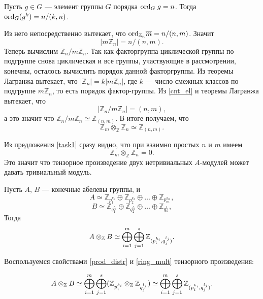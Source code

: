 \begin{Proof}
        \begin{Statement}
            \cite{Vinberg} Пусть $g \in G$ --- элемент группы $G$ порядка $\textup{ord}_G\;g = n$. Тогда $\textup{ord}_G(g^k) = n/(k, n)$.
        \end{Statement}
        Из него непосредственно вытекает, что $\textup{ord}_{\mathbb{Z}_n} \overline{m} = n / (n, m)$. Значит 
        \begin{equation} \label{cnt_el}
            |m\mathbb{Z}_n| = n / (n, m). 
        \end{equation}
        Теперь вычислим $\mathbb{Z}_n / m\mathbb{Z}_n$. Так как факторгруппа циклической группы по подгруппе снова циклическая и все группы, участвующие
        в рассмотрении, конечны, осталось вычислить порядок данной факторгруппы. Из теоремы Лагранжа вытекает, что $|\mathbb{Z}_n| = k|m\mathbb{Z}_n|$, где $k$ --- число смежных классов по
        подгруппе $m\mathbb{Z}_n$, то есть порядок фактор-группы. Из \eqref{cnt_el} и теоремы Лагранжа вытекает, что 
        \begin{equation*}
            |\mathbb{Z}_n / m\mathbb{Z}_n| = (n, m),
        \end{equation*}
        а это значит что $\mathbb{Z}_n / m\mathbb{Z}_n \simeq \mathbb{Z}_{(n, m)}$. В итоге получаем, что
        \begin{equation*}
            \mathbb{Z}_m \otimes_\mathbb{Z} \mathbb{Z}_n \simeq \mathbb{Z}_{(n, m)}.
        \end{equation*}
    \end{Proof}

    Из предложения \ref{task1} сразу видно, что при взаимно простых $n$ и $m$ имеем $$\mathbb{Z}_m \otimes_\mathbb{Z} \mathbb{Z}_n = 0.$$ Это значит что тензорное произведение
    двух нетривиальных $A$-модулей может давать тривиальный модуль.

    \begin{Proposal}
        Пусть $A$, $B$ --- конечные абелевы группы, и
        $$
            A \simeq \mathbb{Z}_{p_1^{k_1}} \oplus \mathbb{Z}_{p_2^{k_2}} \oplus \dots \oplus \mathbb{Z}_{p_m^{k_m}},
        $$
        $$
            B \simeq \mathbb{Z}_{q_1^{l_1}} \oplus \mathbb{Z}_{q_2^{l_2}} \oplus \dots \oplus \mathbb{Z}_{q_s^{l_s}},
        $$
        Тогда 
        $$A \otimes_{\mathbb{Z}} B \simeq \bigoplus_{i=1}^{m} \bigoplus_{j=1}^{s} \mathbb{Z}_{(p_i^{k_i}, q_j^{l_j})}.$$
    \end{Proposal}
    \begin{Proof}
        Воспользуемся свойствами \eqref{prod_distr} и \eqref{ring_mult} тензорного произведения:

        $$
        A \otimes_{\mathbb{Z}} B \simeq \bigoplus_{i=1}^{m} \bigoplus_{j=1}^{s} (\mathbb{Z}_{p_i^{k_i}} \otimes_{\mathbb{Z}} \mathbb{Z}_{q_j^{l_j}}) \simeq 
            \bigoplus_{i=1}^{m} \bigoplus_{j=1}^{s} \mathbb{Z}_{(p_i^{k_i}, q_j^{l_j})}.
        $$
    \end{Proof}

